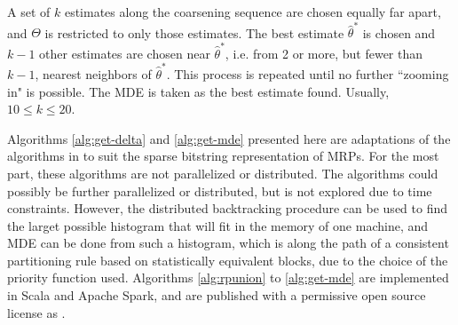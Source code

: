 \documentclass[../scalable-hists.tex]{subfiles}
\begin{document}
  A set of $k$ estimates along the coarsening sequence are chosen equally far apart,
  and $\Theta$ is restricted to only those estimates.
  The best estimate $\hat \theta^*$ is chosen and $k-1$ other estimates are chosen near $\hat \theta^*$,
  i.e. from 2 or more, but fewer than $k - 1$, nearest neighbors of $\hat \theta^*$.
  This process is repeated until no further ``zooming in" is possible.
  The MDE is taken as the best estimate found.
  Usually, $10 \le k \le 20$.

  Algorithms \ref{alg:get-delta} and \ref{alg:get-mde} presented here
  are adaptations of the algorithms in \cite{srp-mde-raaz-teng}
  to suit the sparse bitstring representation of MRPs.
  For the most part, these algorithms are not parallelized or distributed.
  The algorithms could possibly be further parallelized or distributed,
  but is not explored due to time constraints.
  However, the distributed backtracking procedure can be used to find
  the larget possible histogram that will fit in the memory of one machine,
  and MDE can be done from such a histogram, which is along the path 
  of a consistent partitioning rule based on statistically equivalent blocks,
  due to the choice of the priority function used.
  Algorithms \ref{alg:rpunion} to \ref{alg:get-mde} are implemented in Scala and Apache Spark,
  and are published with a permissive open source license as \cite{github-spark-density-tree}.

  

  
\end{document}

